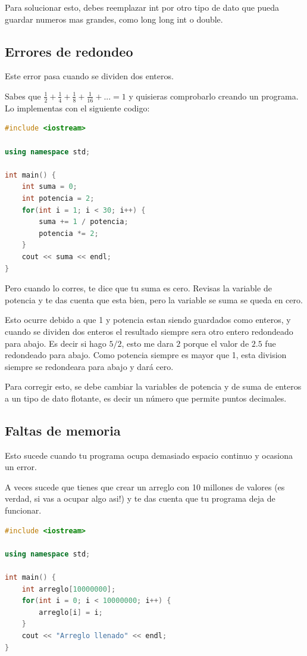 \documentclass{article}
\begin{document}
Para solucionar esto, debes reemplazar int por otro tipo de dato que pueda guardar numeros mas grandes, como long long int o double.

\subsection{Errores de redondeo}
Este error pasa cuando se dividen dos enteros.

Sabes que $\frac{1}{2} + \frac{1}{4} + \frac{1}{8} + \frac{1}{16} + ... = 1$ y quisieras comprobarlo creando un programa. Lo implementas con el siguiente codigo:

\begin{lstlisting}[language=C++, caption=Error de redondeo]
#include <iostream>

using namespace std;

int main() {
    int suma = 0;
    int potencia = 2;
    for(int i = 1; i < 30; i++) {
        suma += 1 / potencia;
        potencia *= 2;
    }
    cout << suma << endl;
}
\end{lstlisting}

Pero cuando lo corres, te dice que tu suma es cero. Revisas la variable de potencia y te das cuenta que esta bien, pero la variable se suma se queda en cero.

Esto ocurre debido a que 1 y potencia estan siendo guardados como enteros, y cuando se dividen dos enteros el resultado siempre sera otro entero redondeado para abajo. Es decir si hago $5 / 2$, esto me dara $2$ porque el valor de $2.5$ fue redondeado para abajo. Como potencia siempre es mayor que 1, esta division siempre se redondeara para abajo y dará cero.

Para corregir esto, se debe cambiar la variables de potencia y de suma de enteros a un tipo de dato flotante, es decir un número que permite puntos decimales.

\subsection{Faltas de memoria}
Esto sucede cuando tu programa ocupa demasiado espacio continuo y ocasiona un error.

A veces sucede que tienes que crear un arreglo con 10 millones de valores (es verdad, si vas a ocupar algo asi!) y te das cuenta que tu programa deja de funcionar.

\begin{lstlisting}[language=C++, caption=Faltas de memoria]
#include <iostream>

using namespace std;

int main() {
    int arreglo[10000000];
    for(int i = 0; i < 10000000; i++) {
        arreglo[i] = i;
    }
    cout << "Arreglo llenado" << endl;
}
\end{lstlisting}
\end{document}
